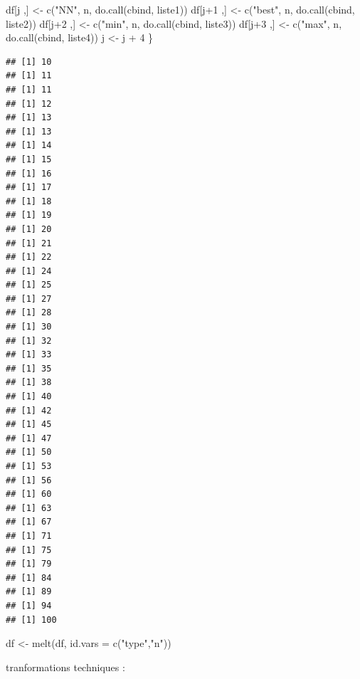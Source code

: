 \documentclass[
]{article}
\newenvironment{Shaded}{\begin{snugshade}}{\end{snugshade}}
\newcommand{\AttributeTok}[1]{\textcolor[rgb]{0.77,0.63,0.00}{#1}}
\newcommand{\DecValTok}[1]{\textcolor[rgb]{0.00,0.00,0.81}{#1}}
\newcommand{\FunctionTok}[1]{\textcolor[rgb]{0.00,0.00,0.00}{#1}}
\newcommand{\NormalTok}[1]{#1}
\newcommand{\OtherTok}[1]{\textcolor[rgb]{0.56,0.35,0.01}{#1}}
\newcommand{\SpecialCharTok}[1]{\textcolor[rgb]{0.00,0.00,0.00}{#1}}
\newcommand{\StringTok}[1]{\textcolor[rgb]{0.31,0.60,0.02}{#1}}
\begin{document}
\begin{Shaded}
\begin{Highlighting}[]
\NormalTok{  df[j ,] }\OtherTok{\textless{}{-}} \FunctionTok{c}\NormalTok{(}\StringTok{"NN"}\NormalTok{, n, }\FunctionTok{do.call}\NormalTok{(cbind, liste1))}
\NormalTok{  df[j}\SpecialCharTok{+}\DecValTok{1}\NormalTok{ ,] }\OtherTok{\textless{}{-}} \FunctionTok{c}\NormalTok{(}\StringTok{"best"}\NormalTok{, n, }\FunctionTok{do.call}\NormalTok{(cbind, liste2))}
\NormalTok{  df[j}\SpecialCharTok{+}\DecValTok{2}\NormalTok{ ,] }\OtherTok{\textless{}{-}} \FunctionTok{c}\NormalTok{(}\StringTok{"min"}\NormalTok{, n, }\FunctionTok{do.call}\NormalTok{(cbind, liste3))}
\NormalTok{  df[j}\SpecialCharTok{+}\DecValTok{3}\NormalTok{ ,] }\OtherTok{\textless{}{-}} \FunctionTok{c}\NormalTok{(}\StringTok{"max"}\NormalTok{, n, }\FunctionTok{do.call}\NormalTok{(cbind, liste4))}
\NormalTok{  j }\OtherTok{\textless{}{-}}\NormalTok{ j }\SpecialCharTok{+} \DecValTok{4}
\NormalTok{\}}
\end{Highlighting}
\end{Shaded}

\begin{verbatim}
## [1] 10
## [1] 11
## [1] 11
## [1] 12
## [1] 13
## [1] 13
## [1] 14
## [1] 15
## [1] 16
## [1] 17
## [1] 18
## [1] 19
## [1] 20
## [1] 21
## [1] 22
## [1] 24
## [1] 25
## [1] 27
## [1] 28
## [1] 30
## [1] 32
## [1] 33
## [1] 35
## [1] 38
## [1] 40
## [1] 42
## [1] 45
## [1] 47
## [1] 50
## [1] 53
## [1] 56
## [1] 60
## [1] 63
## [1] 67
## [1] 71
## [1] 75
## [1] 79
## [1] 84
## [1] 89
## [1] 94
## [1] 100
\end{verbatim}

\begin{Shaded}
\begin{Highlighting}[]
\NormalTok{df }\OtherTok{\textless{}{-}} \FunctionTok{melt}\NormalTok{(df, }\AttributeTok{id.vars =} \FunctionTok{c}\NormalTok{(}\StringTok{"type"}\NormalTok{,}\StringTok{"n"}\NormalTok{))}
\end{Highlighting}
\end{Shaded}

tranformations techniques :
\end{document}
